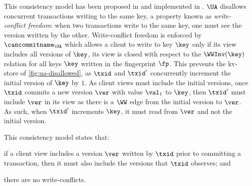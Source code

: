 This consistency model has been proposed in \citet{framework-concur} 
and implemented in \citet{rola}.
\(\UA\) disallows concurrent transactions writing to the same key,
a property known as \emph{write-conflict freedom}:  
when two transactions write to the same key, one must see the version 
written by the other.
Write-conflict freedom is enforced by \(\cancommitname_{\UA}\) which
allows a client to write to key \(\key\) only if its view includes all
versions of \(\key\), \ie its view is closed with respect to the \(\WWInv(\key)\) relation for all keys \(\key\) written in the fingerprint \(\fp\).
This prevents the kv-store of \cref{fig:ua-disallowed},
as \(\txid\) and \(\txid'\) concurrently increment the initial version of \(\key\) by \(1\).
As client views must include the initial versions, once \(\txid\) commits a new version \(\ver\) with value \(\val_1\) to \(\key\), then \(\txid'\) must include \(\ver\) in its view as there is a \(\WW\) edge from the initial version to \(\ver\). 
As such, when \(\txid'\) increments \(\key\), it must read from \(\ver\) and not the initial version.%

This consistency model states that: 
\begin{enumerate*}
	\item if a client view includes a version \(\ver\) written by \( \txid \) prior to committing a transaction, 
then it must also include the versions that \(\txid\) observes; and
	\item there are no write-conflicts.
\end{enumerate*}

